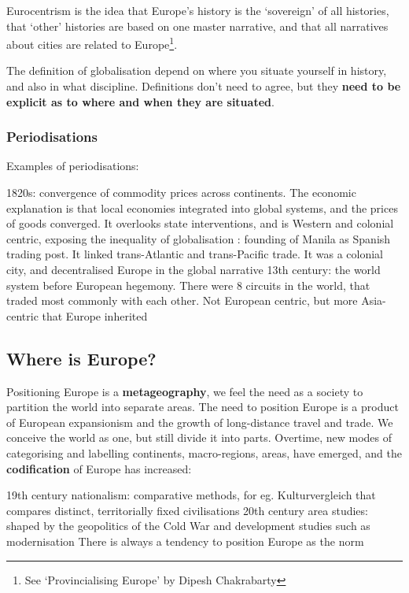 \documentclass{article}
\begin{document}
Eurocentrism is the idea that Europe's history is the `sovereign' of all histories, that `other' histories are based on one master narrative, and that all narratives about cities are related to Europe\footnote{See `Provincialising Europe' by Dipesh Chakrabarty}.

The definition of globalisation depend on where you situate yourself in history, and also in what discipline. Definitions don't need to agree, but they \textbf{need to be explicit as to where and when they are situated}.

\subsubsection{Periodisations}

Examples of periodisations:

\begin{outline}
	\1 1820s: convergence of commodity prices across continents. The economic explanation is that local economies integrated into global systems, and the prices of goods converged. It overlooks state interventions, and is Western and colonial centric, exposing the inequality of globalisation
	: founding of Manila as Spanish trading post. It linked trans-Atlantic and trans-Pacific trade. It was a colonial city, and decentralised Europe in the global narrative
	\1 13th century: the world system before European hegemony. There were 8 circuits in the world, that traded most commonly with each other. Not European centric, but more Asia-centric that Europe inherited
\end{outline}

\subsection{Where is Europe?}

Positioning Europe is a \textbf{metageography}, we feel the need as a society to partition the world into separate areas.
The need to position Europe is a product of European expansionism and the growth of long-distance travel and trade. We conceive the world as one, but still divide it into parts.
Overtime, new modes of categorising and labelling continents, macro-regions, areas, have emerged, and the \textbf{codification} of Europe has increased:

\begin{outline}
	\1 19th century nationalism: comparative methods, for eg. Kulturvergleich that compares distinct, territorially fixed civilisations
	\1 20th century area studies: shaped by the geopolitics of the Cold War and development studies such as modernisation
	\1 There is always a tendency to position Europe as the norm
\end{outline}
\end{document}
